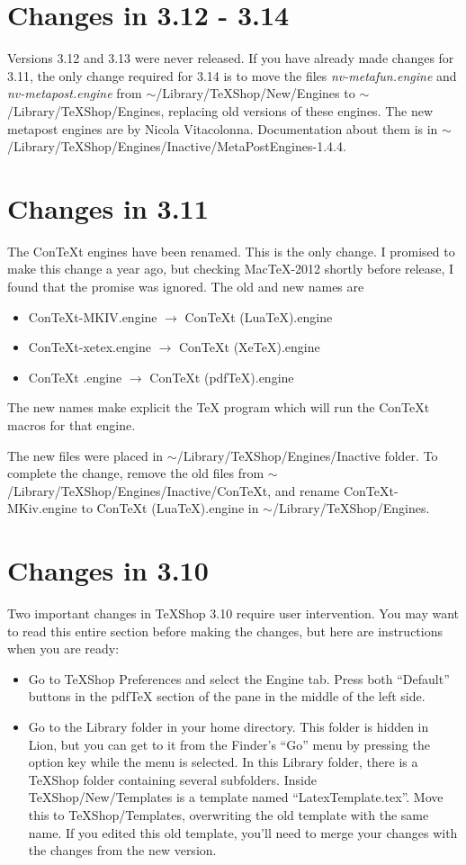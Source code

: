 \documentclass[11pt, oneside]{amsart}
\begin{document}
\section{Changes in 3.12 - 3.14}

Versions 3.12 and 3.13 were never released. If you have already made changes for 3.11,
the only change required for 3.14 is to move the files {\em nv-metafun.engine} and {\em nv-metapost.engine} from $\sim$/Library/TeXShop/New/Engines to
$\sim$/Library/TeXShop/Engines, replacing old versions of these engines. The new metapost engines are by Nicola Vitacolonna. Documentation
about them is in $\sim$/Library/TeXShop/Engines/Inactive/MetaPostEngines-1.4.4.

\section{Changes in 3.11}

The ConTeXt engines have been renamed. This is the only change. I promised to make this change a year ago, but checking MacTeX-2012 shortly
before release, I found that the promise was ignored. The old and new names are
\begin{itemize}
\item ConTeXt-MKIV.engine $\rightarrow$ ConTeXt (LuaTeX).engine
\item ConTeXt-xetex.engine $\rightarrow$ ConTeXt (XeTeX).engine
\item ConTeXt .engine $\rightarrow$ ConTeXt (pdfTeX).engine
\end{itemize}
The new names make explicit the TeX program which will run the ConTeXt macros for that engine.

The new files were placed in  $\sim$/Library/TeXShop/Engines/Inactive folder. To complete the change,
remove the old files from $\sim$/Library/TeXShop/Engines/Inactive/ConTeXt, and rename
 ConTeXt-MKiv.engine to ConTeXt (LuaTeX).engine  in $\sim$/Library/TeXShop/Engines.

\section{Changes in 3.10}

Two important changes in TeXShop 3.10 require user intervention. You may want to read this entire section before making the changes, but here are instructions when you are ready:
\begin{itemize}
\item Go to TeXShop Preferences and select the Engine tab. Press both ``Default'' buttons in the pdfTeX section of the pane in the middle of the left side.
\item Go to the Library folder in your home directory. This folder is hidden in Lion, but you can get to it from the Finder's ``Go'' menu by pressing the option key while the menu is selected.  In this Library folder, there is a TeXShop folder containing several subfolders. Inside TeXShop/New/Templates is a template named
``LatexTemplate.tex''. Move this to TeXShop/Templates, overwriting the old template with the same name. If you edited this old template, you'll need to merge
your changes with the changes from the new version.
\end{itemize}
\end{document}
